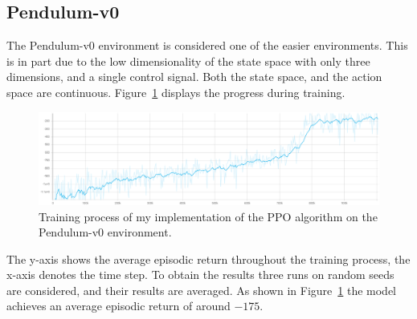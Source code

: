 \subsection{Pendulum-v0}\label{subsec:pendulum-v0}
The Pendulum-v0 environment is considered one of the easier environments.
This is in part due to the low dimensionality of the state space with only three dimensions, and a single control signal.
Both the state space, and the action space are continuous.
Figure~\ref{fig:training_pendulum} displays the progress during training.
\begin{figure}[t]
    \centering
    \includegraphics[width=1\textwidth]{images/presentation/train_pendulum.png}
    \caption{Training process of my implementation of the PPO algorithm on the Pendulum-v0 environment.}
    \label{fig:training_pendulum}
\end{figure}
The y-axis shows the average episodic return throughout the training process, the x-axis denotes the time step.
To obtain the results three runs on random seeds are considered, and their results are averaged.
As shown in Figure~\ref{fig:training_pendulum} the model achieves an average episodic return of around $-175$.


